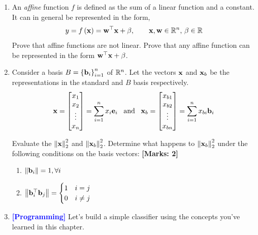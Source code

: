 \begin{enumerate}
    \item An \textit{affine} function $f$ is defined as the sum of a linear function and a constant. It can in general be represented in the form, 
    \[ y = f\left(\mathbf{x}\right) = \mathbf{w}^\top\mathbf{x} + \beta, \quad \quad \mathbf{x}, \mathbf{w} \in \mathbb{R}^n, \, \beta \in \mathbb{R} \]
    Prove that affine functions are not linear. Prove that any affine function can be represented in the form $\mathbf{w}^\top\mathbf{x} + \beta$.

    \item Consider a basis $B = \left\{\mathbf{b}_i\right\}_{i=1}^{n}$ of $\mathbb{R}^n$. Let the vectors $\mathbf{x}$ and $\mathbf{x}_b$ be the representations in the standard and $B$ basis respectively. 
    \[ \mf{x} = \begin{bmatrix*}x_1\\x_2\\\vdots\\x_n\end{bmatrix*} = \sum_{i=1}^{n}x_i\mf{e}_i \,\,\,\,\, \text{and} \,\,\,\,\, \mf{x}_b =  \begin{bmatrix*}x_{b1}\\x_{b2}\\\vdots\\x_{bn}\end{bmatrix*} = \sum_{i=1}^{n}x_{bi}\mf{b}_i \]

    Evaluate the $\left\lVert \mathbf{x}\right\rVert_2^2$ and $\left\lVert \mathbf{x}_b\right\rVert_2^2$. Determine what happens to $\left\lVert \mathbf{x}_b\right\rVert_2^2$ under the following conditions on the basis vectors: \textbf{[Marks: 2]}
    \begin{enumerate}
        \item $\left\lVert \mathbf{b}_i\right\rVert = 1, \forall i$
        \item $\left\lVert \mathbf{b}_i^\top\mathbf{b}_j\right\rVert = \begin{cases}
        1 & i = j\\
        0 & i \neq j
        \end{cases}$
    \end{enumerate}

    \item \textcolor{blue}{\textbf{[Programming]}} Let's build a simple classifier using the concepts you've learned in this chapter. 
\end{enumerate}



